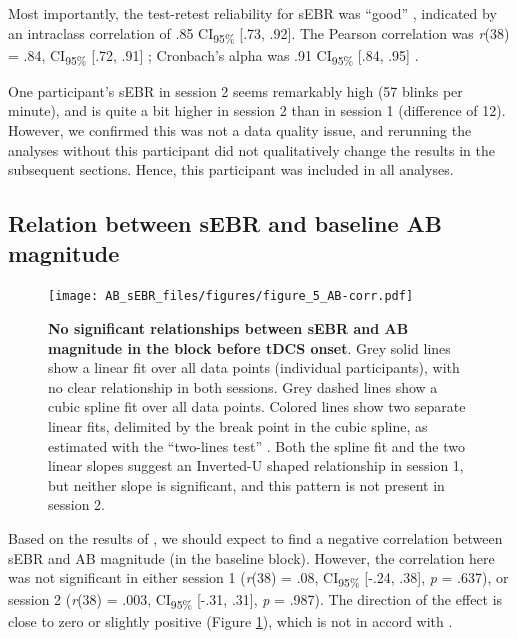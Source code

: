 \documentclass[11pt,]{memoir}
\begin{document}
Most importantly, the test-retest reliability for sEBR was ``good'' \autocite{Koo2016}, indicated by an intraclass correlation of .85 CI\textsubscript{95\%} {[}.73, .92{]}. The Pearson correlation was \emph{r}(38) = .84, CI\textsubscript{95\%} {[}.72, .91{]} \autocite[cf.][]{Dang2017}; Cronbach's alpha was .91 CI\textsubscript{95\%} {[}.84, .95{]} \autocite[cf.][]{Kruis2016}.

One participant's sEBR in session 2 seems remarkably high (57 blinks per minute), and is quite a bit higher in session 2 than in session 1 (difference of 12). However, we confirmed this was not a data quality issue, and rerunning the analyses without this participant did not qualitatively change the results in the subsequent sections. Hence, this participant was included in all analyses.

\hypertarget{AB_sEBR-ABmag}{%
\subsection{Relation between sEBR and baseline AB magnitude}\label{AB_sEBR-ABmag}}

\begin{figure}
\centering
\texttt{[image: AB\_sEBR\_files/figures/figure\_5\_AB-corr.pdf]}
\caption{\label{fig:fig-AB-corr}\textbf{No significant relationships between sEBR and AB magnitude in the block before tDCS onset}. Grey solid lines show a linear fit over all data points (individual participants), with no clear relationship in both sessions. Grey dashed lines show a cubic spline fit over all data points. Colored lines show two separate linear fits, delimited by the break point in the cubic spline, as estimated with the ``two-lines test'' \autocite{Simonsohn2018}. Both the spline fit and the two linear slopes suggest an Inverted-U shaped relationship in session 1, but neither slope is significant, and this pattern is not present in session 2.}
\end{figure}



Based on the results of \textcite{Colzato2008}, we should expect to find a negative correlation between sEBR and AB magnitude (in the baseline block). However, the correlation here was not significant in either session 1 (\emph{r}(38) = .08, CI\textsubscript{95\%} {[}-.24, .38{]}, \emph{p} = .637), or session 2 (\emph{r}(38) = .003, CI\textsubscript{95\%} {[}-.31, .31{]}, \emph{p} = .987). The direction of the effect is close to zero or slightly positive (Figure \ref{fig:fig-AB-corr}), which is not in accord with \textcite{Colzato2008}.
\end{document}

